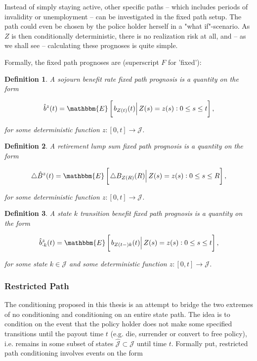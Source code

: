 \documentclass{article}
\newcommand{\1}[1]{\mathbbm{1}_{\left\lbrace #1 \right\rbrace}}
\newcommand{\econd}[2][def]{\mathbbm{E} \left[ \left. #1 \right| #2 \right]}
\theoremstyle{break}
\newtheorem{definition}{Definition}[section]
\theoremstyle{remark}
\numberwithin{equation}{section}
\begin{document}
Instead of simply staying active, other specific paths -- which includes periods of invalidity or unemployment -- can be investigated in the fixed path setup. The path could even be chosen by the police holder herself in a "what if"-scenario. As $Z$ is then conditionally deterministic, there is no realization risk at all, and -- as we shall see -- calculating these prognoses is quite simple.

Formally, the fixed path prognoses are (superscript $F$ for 'fixed'):

\begin{definition} \label{DefSojFix}
	A sojourn benefit rate fixed path prognosis is a quantity on the form
	
	\begin{gather*}
		\hat{b}^z(t) = \econd[b_{Z(t)}(t)]{Z(s) = z(s) : 0 \leq s \leq t},
	\end{gather*}
	
	for some deterministic function $z: [0,t] \to \mathcal{J}$.
\end{definition}

\begin{definition} \label{DefLumpFix}
	A retirement lump sum fixed path prognosis is a quantity on the form
	
	\begin{gather*}
		\triangle \hat{B}^z(t) = \econd[\triangle B_{Z(R)}(R)]{Z(s) = z(s) : 0 \leq s \leq R},
	\end{gather*}
	
	for some deterministic function $z: [0,t] \to \mathcal{J}$.
\end{definition}

\begin{definition} \label{DefTraFix}
	A state $k$ transition benefit fixed path prognosis is a quantity on the form
	
	\begin{gather*}
		\hat{b}_{\cdot k}^z(t) = \econd[b_{Z(t-)k}(t)]{ Z(s) = z(s) : 0 \leq s \leq t},
	\end{gather*}
	
	for some state $k \in \mathcal{J}$ and some deterministic function $z: [0,t] \to \mathcal{J}$.
\end{definition}

\subsubsection{Restricted Path} \label{RestrPathSect}

The conditioning proposed in this thesis is an attempt to bridge the two extremes of no conditioning and conditioning on an entire state path. The idea is to condition on the event that the policy holder does not make some specified transitions until the payout time $t$ (e.g. die, surrender or convert to free policy), i.e. remains in some subset of states $\hat{\mathcal{J}} \subset \mathcal{J}$ until time $t$. Formally put, restricted path conditioning involves events on the form
\end{document}
